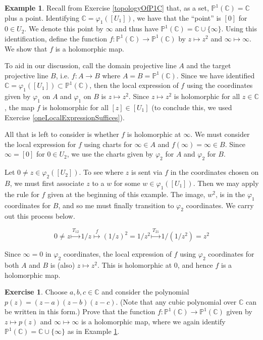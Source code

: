 \documentclass[12pt]{book}%
\theoremstyle{plain}
\theoremstyle{definition}
\newtheorem{example}[theorem]{Example}
\newtheorem{exercise}{Exercise}
\theoremstyle{remark}
\def\to{\rightarrow}
\def\bC{{\mathbb{C}}}
\newcommand{\PoneC}{{\mathbb P}^1({\mathbb C})}
\begin{document}
\begin{example}
\label{xSquaredOnP1C}
Recall from Exercise \ref{topologyOfP1C} that, as a set, $\PoneC = \bC$ plus a point. Identifying $\bC = \varphi_1([U_1])$, we have that the ``point'' is $[0]$ for $0\in U_2$. We denote this point by $\infty$ and thus have $\PoneC = \bC \cup \{\infty\}$. Using this identification, define the function $f:\PoneC \to \PoneC$ by $z \mapsto z^2$ and $\infty \mapsto \infty$. We show that $f$ is a holomorphic map.

To aid in our discussion, call the domain projective line $A$ and the target projective line $B$, i.e. $f:A \to B$ where $A=B=\PoneC$. Since we have identified $\bC=\varphi_1([U_1])\subset \PoneC$, then the local expression of $f$ using the coordinates given by $\varphi_1$ on $A$ and $\varphi_1$ on $B$ is $z \mapsto z^2$. Since $z \mapsto z^2$ is holomorphic for all $z\in\bC$, the map $f$ is holomorphic for all $[z] \in [U_1]$ (to conclude this, we used Exercise \ref{oneLocalExpressionSuffices}).

All that is left to consider is whether $f$ is holomorphic at $\infty$. We must consider the local expression for $f$ using charts for $\infty \in A$ and $f(\infty)=\infty \in B$. Since $\infty = [0]$ for $0\in U_2$, we use the charts given by $\varphi_2$ for $A$ and $\varphi_2$ for $B$. 

Let $0 \neq z\in\varphi_2([U_2])$. To see where $z$ is sent via $f$ in the coordinates chosen on $B$, we must first associate $z$ to a $w$ for some $w\in \varphi_1([U_1])$. Then we may apply the rule for $f$ given at the beginning of this example. The image, $w^2$, is in the $\varphi_1$ coordinates for $B$, and so me must finally transition to $\varphi_2$ coordinates. We carry out this process below.

\[
0 \neq z \stackrel{T_{12}}{\longmapsto}
1/z
\stackrel{f}{\longmapsto}
(1/z)^2 = 1/{z^2}
\stackrel{T_{21}}{\longmapsto}
1/(1/{z^2}) = z^2
\]

Since $\infty=0$ in $\varphi_2$ coordinates, the local expression of $f$ using $\varphi_2$ coordinates for both $A$ and $B$ is (also) $z \mapsto z^2$. This is holomorphic at $0$, and hence $f$ is a holomorphic map.
\end{example}

\noindent\hrulefill

\begin{exercise}
\label{polynomialMapsOfPoneC}
Choose $a,b,c \in \bC$ and consider the polynomial $p(z) = (z-a)(z-b)(z-c)$. (Note that any cubic polynomial over $\bC$ can be written in this form.) Prove that the function $f: \PoneC \to \PoneC$ given by $z \mapsto p(z)$ and $\infty \mapsto \infty$ is a holomorphic map, where we again identify $\PoneC = \bC \cup \{\infty\}$ as in Example \ref{xSquaredOnP1C}.
\end{exercise}
\end{document}
